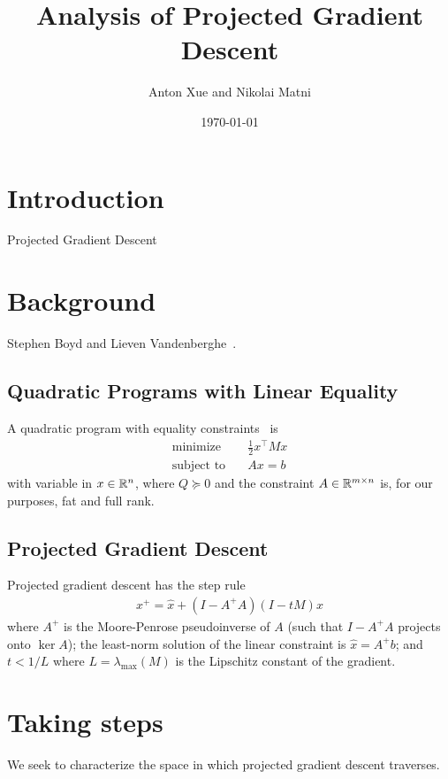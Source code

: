 \documentclass[12pt]{article}
\title{Analysis of Projected Gradient Descent}
\author{Anton Xue and Nikolai Matni}
\date{\today}
\date{}
\begin{document}
\maketitle

\section{Introduction}
Projected Gradient Descent


\section{Background}
Stephen Boyd and Lieven Vandenberghe~\cite{boyd2004convex}.

\subsection{Quadratic Programs with Linear Equality}

A quadratic program with equality constraints~\cite{boyd2004convex} is
\begin{align}
  \text{minimize} &\quad \frac{1}{2} x^\top M x
    \label{eqn:qp} \\
  \text{subject to} &\quad Ax = b
\end{align}
with variable in \(x \in {\mathbb{R}}^n\),
where \(Q \succeq 0\) and the constraint \(A \in {\mathbb{R}}^{m \times n}\) is,
for our purposes, fat and full rank.

\subsection{Projected Gradient Descent}
Projected gradient descent has the step rule
\begin{align*}
  x^+ = \hat{x} + (I - A^+ A) (I - t M) x
\end{align*}
where \(A^+\) is the Moore-Penrose pseudoinverse of \(A\)
(such that \(I - A^+ A\) projects onto \(\ker A\));
the least-norm solution of the linear constraint is \(\hat{x} = A^+ b\);
and \(t < 1/L\) where \(L = \lambda_{\max} (M)\)
is the Lipschitz constant of the gradient.


\section{Taking steps}
We seek to characterize the space in which projected
gradient descent traverses.
\end{document}
